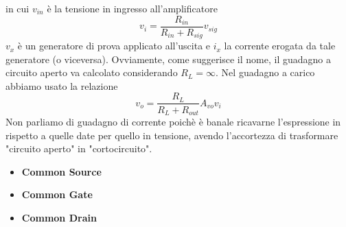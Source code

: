 \documentclass[a4paper,twocolumn,notitlepage]{book}
\begin{document}
		in cui $v_{in}$ è la tensione in ingresso all'amplificatore
			\begin{equation}
			v_{i}=\frac{R_{in}}{R_{in}+R_{sig}} v_{sig}
			\end{equation}
		$v_{x}$ è un generatore di prova applicato all'uscita e $i_{x}$ la corrente erogata da tale generatore (o viceversa). 
		Ovviamente, come suggerisce il nome, il guadagno a circuito aperto va calcolato considerando $R_{L}=\infty$. 
		Nel guadagno a carico abbiamo usato la relazione
			\begin{equation}
			v_{o}=\frac{R_{L}}{R_{L}+R_{out}} A_{vo} v_{i}
			\end{equation}
		Non parliamo di guadagno di corrente poichè è banale ricavarne l'espressione in rispetto a quelle date per quello in tensione, avendo l'accortezza di trasformare "circuito aperto" in "cortocircuito".
		
		\begin{itemize}
				\item \textbf{Common Source}

				
				
				\item \textbf{Common Gate}
				\item \textbf{Common Drain}
		\end{itemize}
		
		
			
\end{document}

